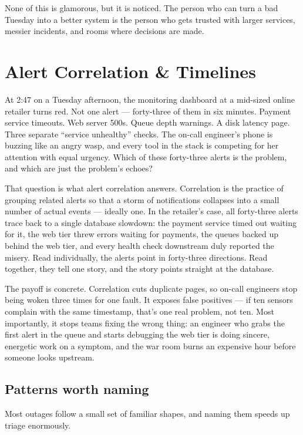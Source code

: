 None of this is glamorous, but it is noticed. The person who can turn a bad Tuesday into a better system is the person who gets trusted with larger services, messier incidents, and rooms where decisions are made.

\section{Alert Correlation \& Timelines}
At 2:47 on a Tuesday afternoon, the monitoring dashboard at a mid-sized online retailer turns red. Not one alert — forty-three of them in six minutes. Payment service timeouts. Web server 500s. Queue depth warnings. A disk latency page. Three separate ``service unhealthy'' checks. The on-call engineer's phone is buzzing like an angry wasp, and every tool in the stack is competing for her attention with equal urgency. Which of these forty-three alerts is the problem, and which are just the problem's echoes?


That question is what alert correlation answers. Correlation is the practice of grouping related alerts so that a storm of notifications collapses into a small number of actual events — ideally one. In the retailer's case, all forty-three alerts trace back to a single database slowdown: the payment service timed out waiting for it, the web tier threw errors waiting for payments, the queues backed up behind the web tier, and every health check downstream duly reported the misery. Read individually, the alerts point in forty-three directions. Read together, they tell one story, and the story points straight at the database.


The payoff is concrete. Correlation cuts duplicate pages, so on-call engineers stop being woken three times for one fault. It exposes false positives — if ten sensors complain with the same timestamp, that's one real problem, not ten. Most importantly, it stops teams fixing the wrong thing: an engineer who grabs the first alert in the queue and starts debugging the web tier is doing sincere, energetic work on a symptom, and the war room burns an expensive hour before someone looks upstream.



\subsection{Patterns worth naming}


Most outages follow a small set of familiar shapes, and naming them speeds up triage enormously.


